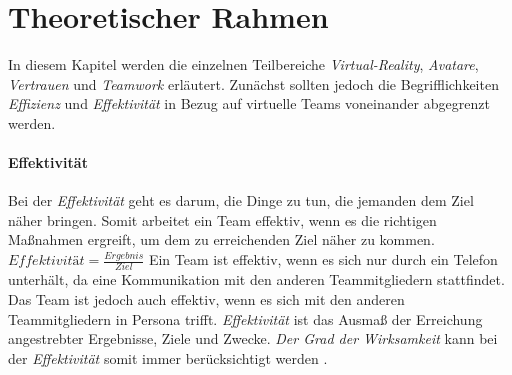 \documentclass[a4paper,11pt]{article}%
\renewcommand{\\}{\vspace*{0.5\baselineskip} \newline}
\begin{document}
%
%
%
%

	\newpage
\section{Theoretischer Rahmen}

In diesem Kapitel werden die einzelnen Teilbereiche \textit{Virtual-Reality}, \textit{Avatare}, \textit{Vertrauen} und \textit{Teamwork} erläutert.
Zunächst sollten jedoch die Begrifflichkeiten \textit{Effizienz} und \textit{Effektivität} in Bezug auf virtuelle Teams voneinander abgegrenzt werden.
%

\paragraph{Effektivität}
Bei der \textit{Effektivität} geht es darum, die Dinge zu tun, die jemanden dem Ziel näher bringen. 
Somit arbeitet ein Team effektiv, wenn es die richtigen Maßnahmen ergreift, um dem zu erreichenden Ziel näher zu kommen.\\
$Effektivität = \frac{Ergebnis}{Ziel}$ \\
Ein Team ist effektiv, wenn es sich nur durch ein Telefon unterhält, da eine Kommunikation mit den anderen Teammitgliedern stattfindet. Das Team ist jedoch auch effektiv, wenn es sich mit den anderen Teammitgliedern in Persona trifft.
\textit{Effektivität} ist das Ausmaß der Erreichung angestrebter Ergebnisse, Ziele und Zwecke.
\textit{Der Grad der Wirksamkeit} kann bei der \textit{Effektivität} somit immer berücksichtigt werden \citep{eichhorn2005prinzip}.
\end{document}
